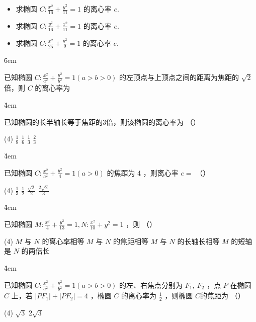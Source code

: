 \begin{example}
    \begin{itemize}
        \item 求椭圆 $C: \frac{x^2}{16}+\frac{y^2}{11}=1$ 的离心率 $e$.
        \item 求椭圆 $C: \frac{y^2}{16}+\frac{x^2}{11}=1$ 的离心率 $e$.
        \item 求椭圆 $C: \frac{x^2}{25}+\frac{y^2}{9}=1$ 的离心率 $e$.
    \end{itemize}
\end{example}

\v{6em}

\begin{example}
    已知椭圆 $C: \frac{x^2}{a^2}+\frac{y^2}{b^2}=1(a>b>0)$ 的左顶点与上顶点之间的距离为焦距的 $\sqrt{2}$ 倍，则 $C$ 的离心率为 \underline{\qquad}
\end{example}

\v{4em}

\begin{example}
    已知椭圆的长半轴长等于焦距的3倍，则该椭圆的离心率为 （\qquad）
    \begin{tasks}(4)
        \task $\frac{1}{8}$
        \task $\frac{1}{6}$
        \task $\frac{1}{3}$
        \task $\frac{2}{3}$
    \end{tasks}
\end{example}

\v{4em}

\begin{example}
    已知椭圆 $C: \frac{x^2}{a^2}+\frac{y^2}{4}=1(a>0)$ 的焦距为 4 ，则离心率 $e=$ （\qquad）
    \begin{tasks}(4)
        \task $\frac{1}{3}$
        \task $\frac{1}{2}$
        \task $\frac{\sqrt{2}}{2}$
        \task $\frac{2 \sqrt{2}}{3}$
    \end{tasks}
\end{example}

\v{4em}

\begin{example}
    已知椭圆 $M: \frac{x^2}{4}+\frac{y^2}{13}=1, N: \frac{x^2}{10}+y^2=1$ ，则 （\qquad）
    \begin{tasks}(4)
        \task $M$ 与 $N$ 的离心率相等
        \task $M$ 与 $N$ 的焦距相等
        \task $M$ 与 $N$ 的长轴长相等
        \task $M$ 的短轴是 $N$ 的两倍长
    \end{tasks}
\end{example}

\v{4em}

\begin{example}
    已知椭圆 $C: \frac{x^2}{a^2}+\frac{y^2}{b^2}=1(a>b>0)$ 的左、右焦点分别为 $F_1, ~ F_2$ ，点 $P$ 在椭圆 $C$ 上，若 $\left|P F_1\right|+\left|P F_2\right|=4$ ，椭圆 $C$ 的离心率为 $\frac{1}{2}$ ，则椭圆 $C$的焦距为 （\qquad）
    \begin{tasks}(4)
        \task $\sqrt{3}$
        \task $2 \sqrt{3}$
    \end{tasks}
\end{example}

